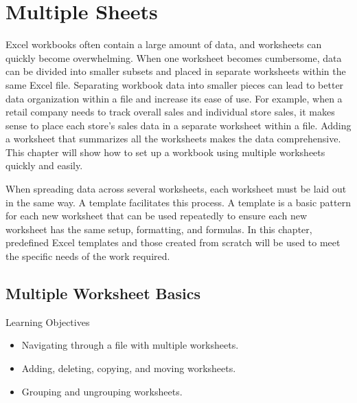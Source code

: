 \chapter{Multiple Sheets}\label{ch06:sheets}

Excel workbooks often contain a large amount of data, and worksheets can quickly become overwhelming. When one worksheet becomes cumbersome, data can be divided into smaller subsets and placed in separate worksheets within the same Excel file. Separating workbook data into smaller pieces can lead to better data organization within a file and increase its ease of use. For example, when a retail company needs to track overall sales and individual store sales, it makes sense to place each store's sales data in a separate worksheet within a file. Adding a worksheet that summarizes all the worksheets makes the data comprehensive. This chapter will show how to set up a workbook using multiple worksheets quickly and easily.

When spreading data across several worksheets, each worksheet must be laid out in the same way. A template facilitates this process. A template is a basic pattern for each new worksheet that can be used repeatedly to ensure each new worksheet has the same setup, formatting, and formulas. In this chapter, predefined Excel templates and those created from scratch will be used to meet the specific needs of the work required.

\section{Multiple Worksheet Basics}

\begin{center}
	\begin{objbox}{Learning Objectives}
		\begin{itemize}
			\setlength{\itemsep}{0pt}
			\setlength{\parskip}{0pt}
			\setlength{\parsep}{0pt}
			
			\item Navigating through a file with multiple worksheets.
			\item Adding, deleting, copying, and moving worksheets.
			\item Grouping and ungrouping worksheets.

		\end{itemize}
	\end{objbox}
\end{center}

